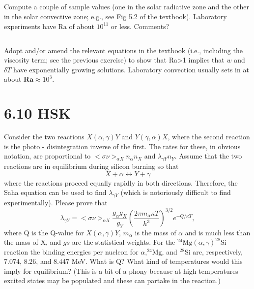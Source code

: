\subsection{}
Compute a couple of sample values (one in the solar radiative zone and the other in the solar convective zone; e.g., see Fig 5.2 of the textbook). Laboratory experiments have Ra of about $10^11$ or less. Comments?

\subsection{}
Adopt and/or amend the relevant equations in the textbook (i.e., including the viscosity term; see the previous exercise) to show that Ra>1 implies that $w$ and $\delta T$ have exponentially  growing solutions. Laboratory convection usually sets in at about $\textbf{Ra}\approx10^3$.


\section{6.10 HSK}
Consider the two reactions $X(\alpha,\gamma)Y$ and $Y(\gamma,\alpha)X$, where the second reaction is the photo - disintegration inverse of the first.
The rates for these, in obvious notation, are proportional to $<\sigma\nu>_{\alpha X} n_\alpha n_X$ and $\lambda_{\gamma Y} n_Y$. 
Assume that the two reactions are in equilibrium during silicon burning so that 
\begin{equation*}
    X+\alpha\leftrightarrow{} Y+\gamma
\end{equation*}
where the reactions proceed equally rapidly in both directions.
Therefore, the Saha equation can be used to find $\lambda_{\gamma Y}$ (which is notoriously difficult to find experimentally).
Please prove that
\begin{equation}
    \lambda_{\gamma Y} = <\sigma\nu>_{\alpha X}\frac{g_\alpha g_X}{g_Y}\left(\frac{2\pi m_\alpha \kappa T}{h^3}\right)^{3/2}e^{-Q/\kappa T},
\end{equation}
where Q is the Q-value for $X(\alpha,\gamma)Y$, $m_\alpha$ is the mass of $\alpha$ and is much less than the mass of X, and $gs$ are the statistical weights.
For the $^{24}\text{Mg}(\alpha,\gamma)^{28}\text{Si}$ reaction the binding energies per nucleon for $\alpha$,$^{24}\text{Mg}$, and $^{28}\text{Si}$ are, respectively, 7.074, 8.26, and 8.447 MeV.
What is Q?
What kind of temperatures would this imply for equilibrium?
(This is a bit of a phony because at high temperatures excited states may be populated and these can partake in the reaction.)



